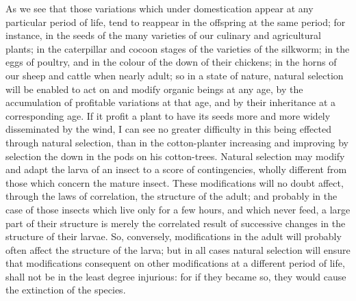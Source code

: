\indent As we see that those variations which under domestication appear at any particular period of life, tend to reappear in the offspring at the same period; for instance, in the seeds of the many varieties of our culinary and agricultural plants; in the caterpillar and cocoon stages of the varieties of the silkworm; in the eggs of poultry, and in the colour of the down of their chickens; in the horns of our sheep and cattle when nearly adult; so in a state of nature, natural selection will be enabled to act on and modify organic beings at any age, by the accumulation of profitable variations at that age, and by their inheritance at a corresponding age. If it profit a plant to have its seeds more and more widely disseminated by the wind, I can see no greater difficulty in this being effected through natural selection, than in the cotton-planter increasing and improving by selection the down in the pods on his cotton-trees.  Natural selection may modify and adapt the larva of an insect to a score of contingencies, wholly different from those which concern the mature insect. These modifications will no doubt affect, through the laws of correlation, the structure of the adult; and probably in the case of those insects which live only for a few hours, and which never feed, a large part of their structure is merely the correlated result of successive changes in the structure of their larvae. So, conversely, modifications in the adult will probably often affect the structure of the larva; but in all cases natural selection will ensure that modifications consequent on other modifications at a different period of life, shall not be in the least degree injurious: for if they became so, they would cause the extinction of the species. \\
